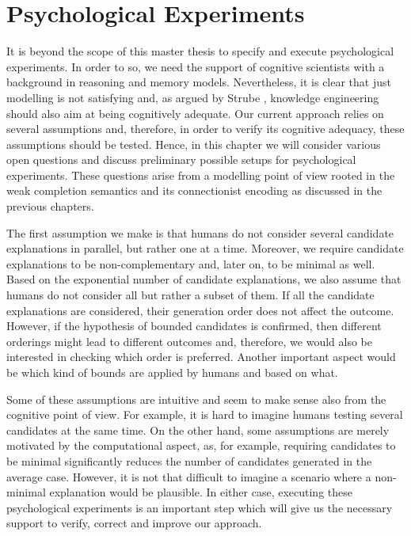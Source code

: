 
\chapter{Psychological Experiments}
\label{sec:exp}

It is beyond the scope of this master thesis to specify and execute psychological experiments. In order to so, we need the support of cognitive scientists with a background in reasoning and memory models. Nevertheless, it is clear that just modelling is not satisfying and, as argued by Strube \cite{strube1992role}, knowledge engineering should also aim at being cognitively adequate. Our current approach relies on several assumptions and, therefore, in order to verify its cognitive adequacy, these assumptions should be tested. Hence, in this chapter we will consider various open questions and discuss preliminary possible setups for psychological experiments. These questions arise from a modelling point of view rooted in the weak completion semantics and its connectionist encoding as discussed in the previous chapters. 

The first assumption we make is that humans do not consider several candidate explanations in parallel, but rather one at a time. Moreover, we require candidate explanations to be non-complementary and, later on, to be minimal as well. Based on the exponential number of candidate explanations, we also assume that humans do not consider all but rather a subset of them. If all the candidate explanations are considered, their generation order does not affect the outcome. However, if the hypothesis of bounded candidates is confirmed, then different orderings might lead to different outcomes and, therefore, we would also be interested in checking which order is preferred. Another important aspect would be which kind of bounds are applied by humans and based on what.

Some of these assumptions are intuitive and seem to make sense also from the cognitive point of view. For example, it is hard to imagine humans testing several candidates at the same time. On the other hand, some assumptions are merely motivated by the computational aspect, as, for example, requiring candidates to be minimal significantly reduces the number of candidates generated in the average case. However, it is not that difficult to imagine a scenario where a non-minimal explanation would be plausible. In either case, executing these psychological experiments is an important step which will give us the necessary support to verify, correct and improve our approach.


